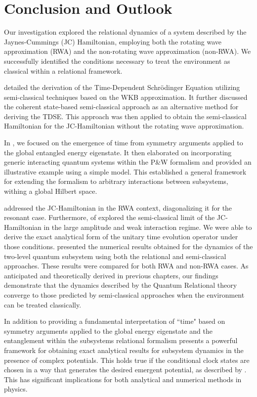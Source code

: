 \chapter{Conclusion and Outlook\label{chap:conclusion}}

Our investigation explored the relational dynamics of a system described by the Jaynes-Cummings (JC) Hamiltonian, employing both the rotating wave approximation (RWA) and the non-rotating wave approximation (non-RWA). We successfully identified the conditions necessary to treat the environment as classical within a relational framework.

 detailed the derivation of the Time-Dependent Schrödinger Equation utilizing semi-classical techniques based on the WKB approximation. It further discussed the coherent state-based semi-classical approach as an alternative method for deriving the TDSE. This approach was then applied to obtain the semi-classical Hamiltonian for the JC-Hamiltonian without the rotating wave approximation.

In , we focused on the emergence of time from symmetry arguments applied to the global entangled energy eigenstate. It then elaborated on incorporating generic interacting quantum systems within the P\&W formalism and provided an illustrative example using a simple model. This established a general framework for extending the formalism to arbitrary interactions between subsystems, withing a global Hilbert space.

 addressed the JC-Hamiltonian in the RWA context, diagonalizing it for the resonant case. Furthermore,  of  explored the semi-classical limit of the JC-Hamiltonian in the large amplitude and weak interaction regime. We were able to derive the exact analytical form of the unitary time evolution operator under those conditions.  presented the numerical results obtained for the dynamics of the two-level quantum subsystem using both the relational and semi-classical approaches. These results were compared for both RWA and non-RWA cases. As anticipated and theoretically derived in previous chapters, our findings demonstrate that the dynamics described by the Quantum Relational theory converge to those predicted by semi-classical approaches when the environment can be treated classically.

In addition to providing a fundamental interpretation of ``time" based on symmetry arguments applied to the global energy eigenstate and the entanglement within the subsystems relational formalism presents a powerful framework for obtaining exact analytical results for subsystem dynamics in the presence of complex potentials. This holds true if the conditional clock states are chosen in a way that generates the desired emergent potential, as described by . This has significant implications for both analytical and numerical methods in physics.

